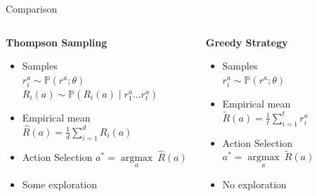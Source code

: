 \documentclass[11pt,table]{beamer}
\begin{document}
\begin{frame}{Comparison}
\begin{columns}[T]
\begin{column}{0.5\textwidth}
\textbf{Thompson Sampling}
\begin{itemize}
\item   Samples \\
$r_i^a \sim \mathbb{P}\left(r^a ; \theta\right)$
$R_i(a) \sim \mathbb{P}\left(R_i(a) \mid r_1^a \ldots r_t^a\right)$ \\[2ex]

\item   Empirical mean
$
\hat{R}(a)=\frac{1}{d} \sum_{i=1}^d R_i(a)
$\\[2ex]

    
\item   Action Selection
$
a^*=\underset{a}{\operatorname{argmax}}\ \hat{R}(a)
$\\[2ex]


\item   \textcolor{red1}{Some exploration}

\end{itemize}
\end{column}
\begin{column}{0.5\textwidth}
\textbf{Greedy Strategy}
\begin{itemize}
\item  Samples\\
$r_i^a \sim \mathbb{P}\left(r^a ; \theta\right)$\\[4.4ex]

\item  Empirical mean
$
\tilde{R}(a)=\frac{1}{t} \sum_{i=1}^t r_i^a
$\\[2ex]


\item  Action Selection
$a^* = \underset{a}{\operatorname{argmax}}\ \tilde{R}(a)$\\[2ex]


\item \textcolor{red1}{No exploration}
\end{itemize}
\end{column}
\end{columns}
\vspace{8mm}
\citep{russo2018tutorial}
\end{frame}
\end{document}

